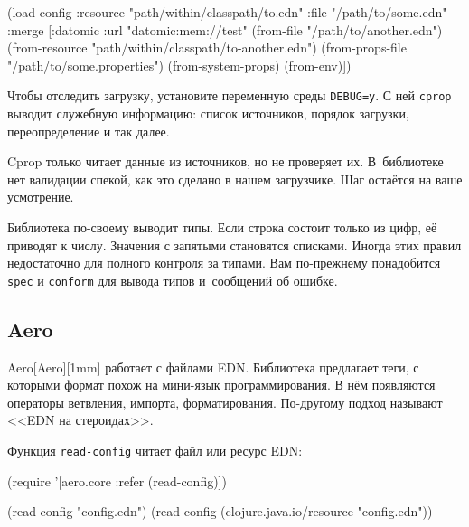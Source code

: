 \begin{english}
  \begin{clojure}
(load-config
 :resource "path/within/classpath/to.edn"
 :file "/path/to/some.edn"
 :merge [{:datomic {:url "datomic:mem://test"}}
         (from-file "/path/to/another.edn")
         (from-resource "path/within/classpath/to-another.edn")
         (from-props-file "/path/to/some.properties")
         (from-system-props)
         (from-env)])
  \end{clojure}
\end{english}

Чтобы отследить загрузку, установите переменную среды \verb|DEBUG=y|. С ней
\verb|cprop| выводит служебную информацию: список источников, порядок загрузки,
переопределение и так далее.

Cprop только читает данные из источников, но не проверяет их. В~библиотеке нет
валидации спекой, как это сделано в нашем загрузчике. Шаг остаётся на ваше
усмотрение.

Библиотека по-своему выводит типы. Если строка состоит только из цифр, её
приводят к числу. Значения с запятыми становятся списками. Иногда этих правил
недостаточно для полного контроля за типами. Вам по-прежнему понадобится
\verb|spec| и \verb|conform| для вывода типов и~сообщений об ошибке.

\subsection{Aero}


Aero[Aero][1mm] работает с файлами
EDN. Библиотека предлагает теги, с которыми формат похож на мини-язык
программирования. В нём появляются операторы ветвления, импорта,
форматирования. По-другому подход называют <<EDN на стероидах>>.


Функция \verb|read-config| читает файл или ресурс EDN:

\begin{english}
  \begin{clojure}
(require '[aero.core :refer (read-config)])

(read-config "config.edn")
(read-config (clojure.java.io/resource "config.edn"))
  \end{clojure}
\end{english}


